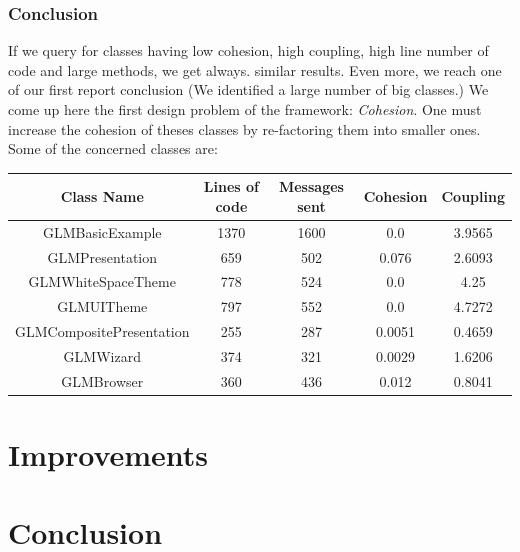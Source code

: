\documentclass[11pt,a4paper]{article}
\begin{document}
\subsubsection{Conclusion}
If we query for classes having low cohesion, high coupling, high line number of code and large methods, we get always. similar results. Even more, we reach one of our first report conclusion (We identified a large number of big classes.) We come up here the first design problem of the framework: \emph{Cohesion}. One must increase the cohesion of theses classes by re-factoring them into smaller ones.\\

Some of the concerned classes are:\\ 

\begin{tabular}{| c | c | c | c | c |}
\hline 
\textbf{Class Name} &\textbf{ Lines of code} & \textbf{Messages sent} & \textbf{Cohesion} & \textbf{Coupling}\\
\hline
GLMBasicExample & 1370 & 1600 & 0.0 & 3.9565\\
\hline
GLMPresentation & 659 & 502 & 0.076 & 2.6093\\
\hline
GLMWhiteSpaceTheme & 778 & 524 & 0.0 & 4.25 \\
\hline
GLMUITheme & 797 & 552 & 0.0 & 4.7272\\
\hline
GLMCompositePresentation & 255 & 287 & 0.0051 & 0.4659\\
\hline 
GLMWizard &  374 & 321 & 0.0029 & 1.6206\\
\hline
GLMBrowser & 360 & 436 & 0.012 & 0.8041\\
\hline
\end{tabular}
\section{Improvements}
\section{Conclusion}
\end{document}
